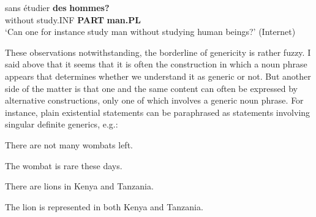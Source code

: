  \ea\label{}
\gll sans  étudier  \textbf{des} \textbf{hommes?} \\


without  study.INF  \textbf{PART} \textbf{man.PL} \\

\glt ‘Can one for instance study man without studying human beings?’ (Internet)

\z

These observations notwithstanding, the borderline of genericity is rather fuzzy. I said above that it seems that it is often the construction in which a noun phrase appears that determines whether we understand it as generic or not. But another side of the matter is that one and the same content can often be expressed by alternative constructions, only one of which involves a generic noun phrase. For instance, plain existential statements can be paraphrased as statements involving singular definite generics, e.g.:


\item 

There are not many wombats left.


\item 

The wombat is rare these days.


\item 

There are lions in Kenya and Tanzania.


\item 

The lion is represented in both Kenya and Tanzania. 



